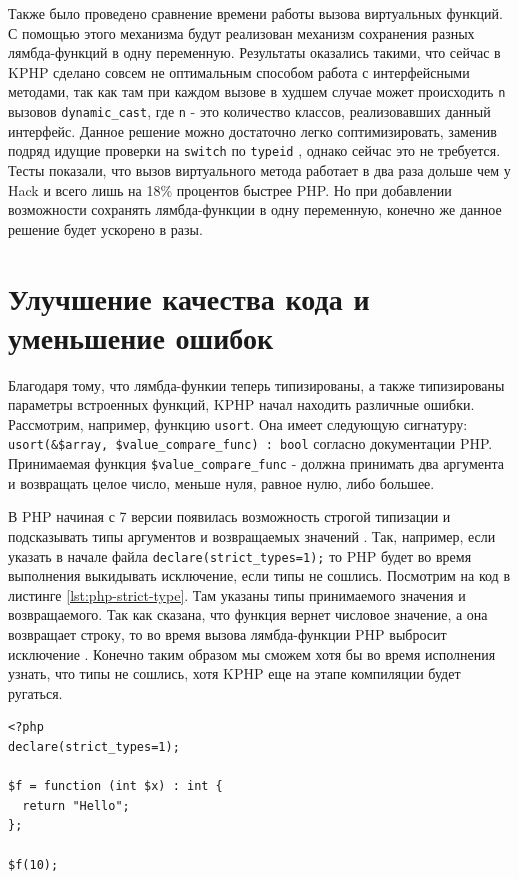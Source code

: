 Также было проведено сравнение времени работы вызова виртуальных функций.
С помощью этого механизма будут реализован механизм сохранения разных лямбда-функций в одну переменную.
Результаты оказались такими, что сейчас в KPHP сделано совсем не оптимальным способом работа с интерфейсными методами, так как там при каждом вызове в худшем случае может происходить \verb|n| вызовов \verb|dynamic_cast|, где \verb|n| - это количество классов, реализовавших данный интерфейс.
Данное решение можно достаточно легко соптимизировать, заменив подряд идущие проверки на \verb|switch| по \verb|typeid| \cite{fast-dynamic-cast}, однако сейчас это не требуется.
Тесты показали, что вызов виртуального метода работает в два раза дольше чем у Hack и всего лишь на 18\% процентов быстрее PHP.
Но при добавлении возможности сохранять лямбда-функции в одну переменную, конечно же данное решение будет ускорено в разы.

\section{Улучшение качества кода и уменьшение ошибок}
Благодаря тому, что лямбда-функии теперь типизированы, а также типизированы параметры встроенных функций, KPHP начал находить различные ошибки.
Рассмотрим, например, функцию \verb|usort|.
Она имеет следующую сигнатуру: \verb|usort(&$array, $value_compare_func) : bool| согласно документации PHP.
Принимаемая функция \verb|$value_compare_func| - должна принимать два аргумента и возвращать целое число, меньше нуля, равное нулю, либо большее.

В PHP начиная с 7 версии появилась возможность строгой типизации и подсказывать типы аргументов и возвращаемых значений \cite{php-7-strict-types}.
Так, например, если указать в начале файла \verb|declare(strict_types=1);| то PHP будет во время выполнения выкидывать исключение, если типы не сошлись.
Посмотрим на код в листинге \ref{lst:php-strict-type}.
Там указаны типы принимаемого значения и возвращаемого.
Так как сказана, что функция вернет числовое значение, а она возвращает строку, то во время вызова лямбда-функции PHP выбросит исключение \cite{php-7-pitfalls}.
Конечно таким образом мы сможем хотя бы во время исполнения узнать, что типы не сошлись, хотя KPHP еще на этапе компиляции будет ругаться.
\begin{lstlisting}[caption={Пример типизации в PHP7}, label={lst:php-strict-type}]
<?php
declare(strict_types=1);

$f = function (int $x) : int {
  return "Hello";
};

$f(10);
\end{lstlisting}

